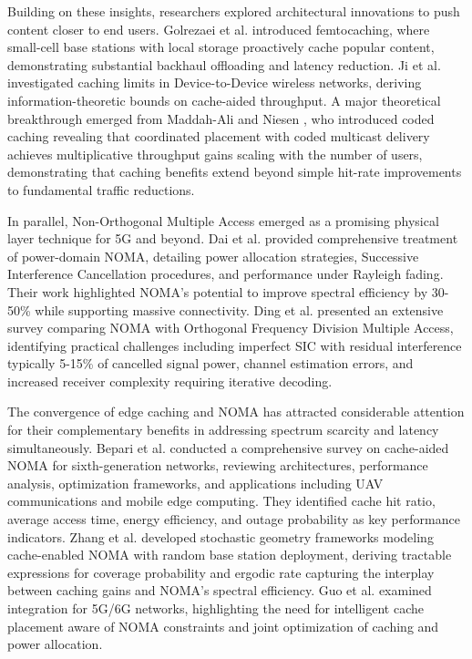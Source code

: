 \documentclass[12pt,a4paper]{article}
\begin{document}
Building on these insights, researchers explored architectural innovations to push content closer to end users. Golrezaei et al. \cite{b_golrezaei} introduced femtocaching, where small-cell base stations with local storage proactively cache popular content, demonstrating substantial backhaul offloading and latency reduction. Ji et al. \cite{b_ji_d2d} investigated caching limits in Device-to-Device wireless networks, deriving information-theoretic bounds on cache-aided throughput. A major theoretical breakthrough emerged from Maddah-Ali and Niesen \cite{b_maddah_ali}, who introduced coded caching revealing that coordinated placement with coded multicast delivery achieves multiplicative throughput gains scaling with the number of users, demonstrating that caching benefits extend beyond simple hit-rate improvements to fundamental traffic reductions.

In parallel, Non-Orthogonal Multiple Access emerged as a promising physical layer technique for 5G and beyond. Dai et al. \cite{b_dai_noma} provided comprehensive treatment of power-domain NOMA, detailing power allocation strategies, Successive Interference Cancellation procedures, and performance under Rayleigh fading. Their work highlighted NOMA's potential to improve spectral efficiency by 30-50\% while supporting massive connectivity. Ding et al. \cite{b_ding_survey} presented an extensive survey comparing NOMA with Orthogonal Frequency Division Multiple Access, identifying practical challenges including imperfect SIC with residual interference typically 5-15\% of cancelled signal power, channel estimation errors, and increased receiver complexity requiring iterative decoding.

The convergence of edge caching and NOMA has attracted considerable attention for their complementary benefits in addressing spectrum scarcity and latency simultaneously. Bepari et al. \cite{b_survey_bepari} conducted a comprehensive survey on cache-aided NOMA for sixth-generation networks, reviewing architectures, performance analysis, optimization frameworks, and applications including UAV communications and mobile edge computing. They identified cache hit ratio, average access time, energy efficiency, and outage probability as key performance indicators. Zhang et al. \cite{b_zhang_stochastic} developed stochastic geometry frameworks modeling cache-enabled NOMA with random base station deployment, deriving tractable expressions for coverage probability and ergodic rate capturing the interplay between caching gains and NOMA's spectral efficiency. Guo et al. \cite{b_guo_edge} examined integration for 5G/6G networks, highlighting the need for intelligent cache placement aware of NOMA constraints and joint optimization of caching and power allocation.
\end{document}
